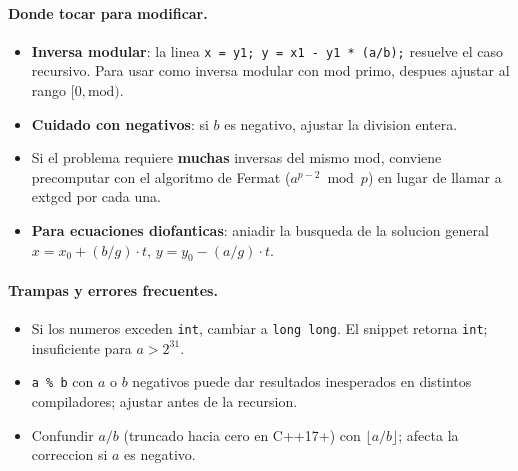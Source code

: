 \paragraph{Donde tocar para modificar.}
\begin{itemize}\setlength\itemsep{0pt}
	\item \textbf{Inversa modular}: la linea \texttt{x = y1; y = x1 - y1 * (a/b);} resuelve el caso recursivo. Para usar como inversa modular con mod primo, despues ajustar al rango $[0, \text{mod})$.
	\item \textbf{Cuidado con negativos}: si $b$ es negativo, ajustar la division entera.
	\item Si el problema requiere \textbf{muchas} inversas del mismo mod, conviene precomputar con el algoritmo de Fermat ($a^{p-2} \bmod p$) en lugar de llamar a extgcd por cada una.
	\item \textbf{Para ecuaciones diofanticas}: aniadir la busqueda de la solucion general $x = x_0 + (b/g) \cdot t$, $y = y_0 - (a/g) \cdot t$.
\end{itemize}

\paragraph{Trampas y errores frecuentes.}
\begin{itemize}\setlength\itemsep{0pt}
	\item Si los numeros exceden \texttt{int}, cambiar a \texttt{long long}. El snippet retorna \texttt{int}; insuficiente para $a > 2^{31}$.
	\item \texttt{a \% b} con $a$ o $b$ negativos puede dar resultados inesperados en distintos compiladores; ajustar antes de la recursion.
	\item Confundir $a/b$ (truncado hacia cero en C++17+) con $\lfloor a/b \rfloor$; afecta la correccion si $a$ es negativo.
\end{itemize}

